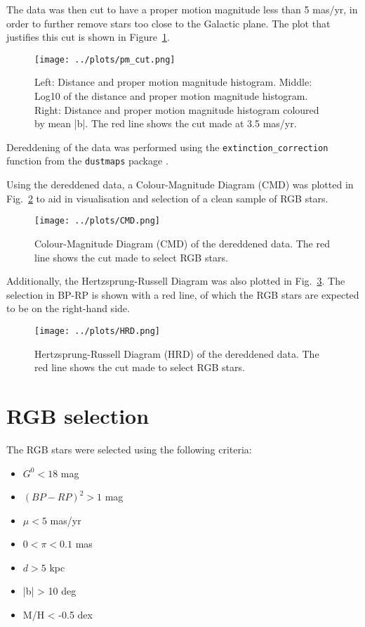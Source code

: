 \documentclass[11pt,a4paper]{article}
\begin{document}
The data was then cut to have a proper motion magnitude less than 5 mas/yr, in order to further remove stars too close to the Galactic plane. The plot that justifies this cut is shown in Figure~\ref{fig:pm_cut}.

\begin{figure}
    \centering
    \texttt{[image: ../plots/pm\_cut.png]}
    \caption{Left: Distance and proper motion magnitude histogram. Middle: Log10 of the distance and proper motion magnitude histogram. Right: Distance and proper motion magnitude histogram coloured by mean |b|. The red line shows the cut made at 3.5 mas/yr.}
    \label{fig:pm_cut}
\end{figure}

Dereddening of the data was performed using the \texttt{extinction\_correction} function from the \texttt{dustmaps} package \citep{Green2018}. 

Using the dereddened data, a Colour-Magnitude Diagram (CMD) was plotted in Fig.~\ref{fig:cmd} to aid in visualisation and selection of a clean sample of RGB stars.

\begin{figure}
    \centering
    \texttt{[image: ../plots/CMD.png]}
    \caption{Colour-Magnitude Diagram (CMD) of the dereddened data. The red line shows the cut made to select RGB stars.}
    \label{fig:cmd}
\end{figure}

Additionally, the Hertzsprung-Russell Diagram was also plotted in Fig.~\ref{fig:hrd}. The selection in BP-RP is shown with a red line, of which the RGB stars are expected to be on the right-hand side.

\begin{figure}
    \centering
    \texttt{[image: ../plots/HRD.png]}
    \caption{Hertzsprung-Russell Diagram (HRD) of the dereddened data. The red line shows the cut made to select RGB stars.}
    \label{fig:hrd}
\end{figure}
\clearpage
\section{RGB selection}
\label{sec:rgb_selection}
The RGB stars were selected using the following criteria:
\begin{itemize}
    \item $G^0 < 18$ mag
    \item $(BP-RP)^2 > 1$ mag
    \item $\mu < 5$ mas/yr
    \item $0 < \pi < 0.1$ mas
    \item $d > 5$ kpc
    \item |b| > 10 deg
    \item M/H < -0.5 dex
\end{itemize}
\end{document}
